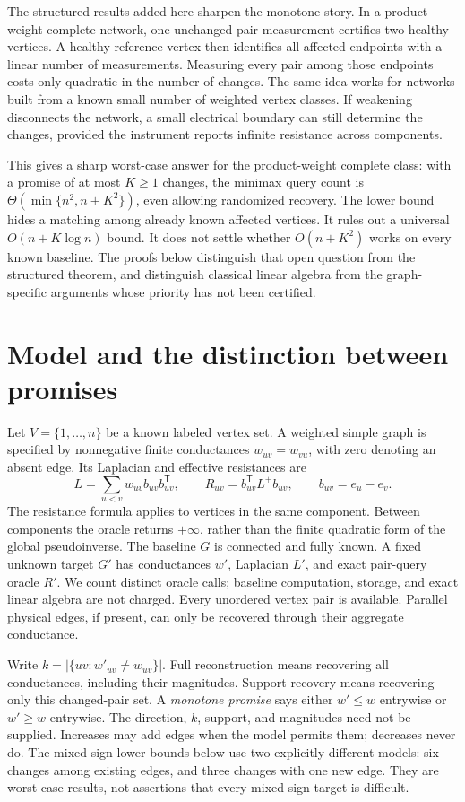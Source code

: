 \documentclass[11pt,letterpaper]{article}
\begin{document}
The structured results added here sharpen the monotone story. In a product-weight complete network, one unchanged pair measurement certifies two healthy vertices. A healthy reference vertex then identifies all affected endpoints with a linear number of measurements. Measuring every pair among those endpoints costs only quadratic in the number of changes. The same idea works for networks built from a known small number of weighted vertex classes. If weakening disconnects the network, a small electrical boundary can still determine the changes, provided the instrument reports infinite resistance across components.

This gives a sharp worst-case answer for the product-weight complete class: with a promise of at most $K\ge1$ changes, the minimax query count is $\Theta(\min\{n^2,n+K^2\})$, even allowing randomized recovery. The lower bound hides a matching among already known affected vertices. It rules out a universal $O(n+K\log n)$ bound. It does not settle whether $O(n+K^2)$ works on every known baseline. The proofs below distinguish that open question from the structured theorem, and distinguish classical linear algebra from the graph-specific arguments whose priority has not been certified.

\section{Model and the distinction between promises}
Let $V=\{1,\ldots,n\}$ be a known labeled vertex set. A weighted simple graph is specified by nonnegative finite conductances $w_{uv}=w_{vu}$, with zero denoting an absent edge. Its Laplacian and effective resistances are
\[
 L=\sum_{u<v}w_{uv}b_{uv}b_{uv}^{\mathsf T},\qquad
 R_{uv}=b_{uv}^{\mathsf T}L^+b_{uv},\qquad b_{uv}=e_u-e_v.
\]
The resistance formula applies to vertices in the same component. Between components the oracle returns $+\infty$, rather than the finite quadratic form of the global pseudoinverse. The baseline $G$ is connected and fully known. A fixed unknown target $G'$ has conductances $w'$, Laplacian $L'$, and exact pair-query oracle $R'$. We count distinct oracle calls; baseline computation, storage, and exact linear algebra are not charged. Every unordered vertex pair is available. Parallel physical edges, if present, can only be recovered through their aggregate conductance.

Write $k=|\{uv:w'_{uv}\ne w_{uv}\}|$. Full reconstruction means recovering all conductances, including their magnitudes. Support recovery means recovering only this changed-pair set. A \emph{monotone promise} says either $w'\le w$ entrywise or $w'\ge w$ entrywise. The direction, $k$, support, and magnitudes need not be supplied. Increases may add edges when the model permits them; decreases never do. The mixed-sign lower bounds below use two explicitly different models: six changes among existing edges, and three changes with one new edge. They are worst-case results, not assertions that every mixed-sign target is difficult.
\end{document}

